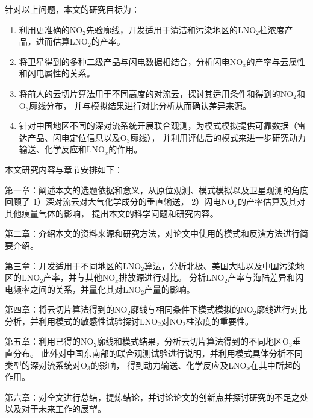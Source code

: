 针对以上问题，本文的研究目标为：

\begin{enumerate}[label=（\arabic*）, labelindent=\parindent, leftmargin=0pt, widest=0, itemindent=*, topsep=0pt, partopsep=0pt, parsep=0pt]

\item 利用更准确的NO$_2$先验廓线，开发适用于清洁和污染地区的LNO$_2$柱浓度产品，进而估算LNO$_2$的产率。

\item 将卫星得到的多种二级产品与闪电数据相结合，分析闪电NO$_x$的产率与云属性和闪电属性的关系。

\item 将前人的云切片算法用于不同高度的对流云，探讨其适用条件和得到的NO$_2$和O$_3$廓线分布，
并与模拟结果进行对比分析从而确认差异来源。

\item 针对中国地区不同的深对流系统开展联合观测，为模式模拟提供可靠数据（雷达产品、闪电定位信息以及O$_3$廓线），
并利用评估后的模式来进一步研究动力输送、化学反应和LNO$_x$的作用。

\end{enumerate}

本文研究内容与章节安排如下：

第一章：阐述本文的选题依据和意义，从原位观测、模式模拟以及卫星观测的角度回顾了
1）深对流云对大气化学成分的垂直输送，
2）闪电NO$_x$的产率估算及其对其他痕量气体的影响，
提出本文的科学问题和研究内容。

第二章：介绍本文的资料来源和研究方法，对论文中使用的模式和反演方法进行简要介绍。

第三章：开发适用于不同地区的LNO$_2$算法，分析北极、美国大陆以及中国污染地区的LNO$_2$产率，并与其他NO$_x$排放源进行对比。
分析LNO$_2$产率与海陆差异和闪电频率之间的关系，并量化其对LNO$_2$产量的影响。

第四章：将云切片算法得到的NO$_2$廓线与相同条件下模式模拟的NO$_2$廓线进行对比分析，并利用模式的敏感性试验探讨LNO$_2$对NO$_2$柱浓度的重要性。

第五章：利用已得的NO$_2$廓线和模式结果，分析云切片算法得到的不同地区O$_3$垂直分布。
此外对中国东南部的联合观测试验进行说明，并利用模式具体分析不同类型的深对流系统对O$_3$的影响，
得到动力输送、化学反应及LNO$_x$在其中所起的作用。

第六章：对全文进行总结，提炼结论，并讨论论文的创新点并探讨研究的不足之处以及对于未来工作的展望。
